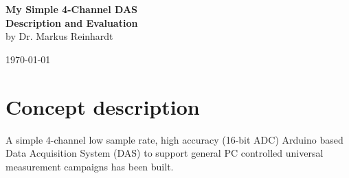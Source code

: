\documentclass[11pt, oneside]{scrartcl}   	%
\begin{document}
\begingroup
	\thispagestyle{empty}
	\centering
	\par\normalfont\fontsize{30}{30}\sffamily\selectfont
	\vspace*{1.0cm}
	{\color{blue}
		\textbf{\Huge My Simple 4-Channel DAS} \\ 
		\textbf{\huge Description and Evaluation} \\
		\vspace*{0.5cm}
		\hspace{-0.3cm}
		{\textbf\huge by Dr. Markus Reinhardt }\par %
		\hspace{-1.3cm}
		{\textbf \huge  \today}\par %
		\vspace*{1.5cm}
	}
\endgroup
\vfill

\newpage
\thispagestyle{empty}
\tableofcontents
\newpage

\newpage
\thispagestyle{empty}
\listoffigures
\listoftables

\newpage
\pagestyle{scrheadings}
\section{Concept description}
A simple 4-channel low sample rate, high accuracy (16-bit ADC)
Arduino based Data Acquisition System (DAS) to support general PC controlled universal 
measurement campaigns has been built.\\
\end{document}
